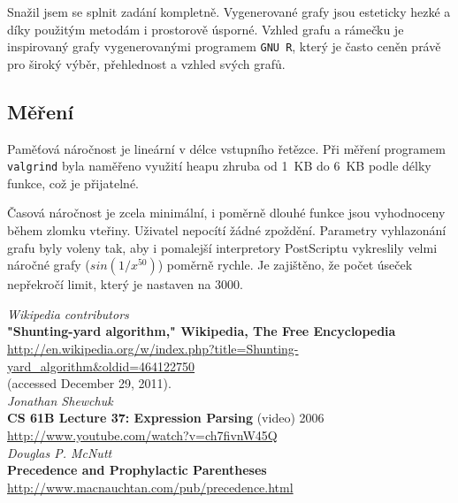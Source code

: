 \documentclass[11pt]{article}
\begin{document}
Snažil jsem se splnit zadání kompletně. Vygenerované grafy jsou esteticky hezké
a díky použitým metodám i prostorově úsporné. Vzhled grafu a rámečku je
inspirovaný grafy vygenerovanými programem \texttt{GNU R}, který je často ceněn
právě pro široký výběr, přehlednost a vzhled svých grafů. 

\subsection{Měření}
Paměťová náročnost je lineární v délce vstupního řetězce. Při měření programem
\texttt{valgrind} byla naměřeno využití heapu zhruba od 1~KB do 6~KB podle délky
funkce, což je přijatelné.

Časová náročnost je zcela minimální, i poměrně dlouhé funkce jsou vyhodnoceny
během zlomku vteřiny. Uživatel nepocítí žádné zpoždění. Parametry vyhlazonání
grafu byly voleny tak, aby i pomalejší interpretory PostScriptu vykreslily
velmi náročné grafy ($sin(1/x^{50})$) poměrně rychle. Je zajištěno, že počet
úseček nepřekročí limit, který je nastaven na 3000.



\begin{thebibliography}{1}
{\em Wikipedia contributors} \\ 
{\bf "Shunting-yard algorithm," Wikipedia, The Free Encyclopedia} \\
\url{http://en.wikipedia.org/w/index.php?title=Shunting-yard_algorithm&oldid=464122750} \\
(accessed December 29, 2011). \\

{\em Jonathan Shewchuk} \\
{\bf CS 61B Lecture 37: Expression Parsing} (video) 2006 \\
\url{http://www.youtube.com/watch?v=ch7fivnW45Q} \\

{\em Douglas P. McNutt} \\
{\bf Precedence and Prophylactic Parentheses} \\
\url{http://www.macnauchtan.com/pub/precedence.html} \\
\end{thebibliography}
\end{document}
